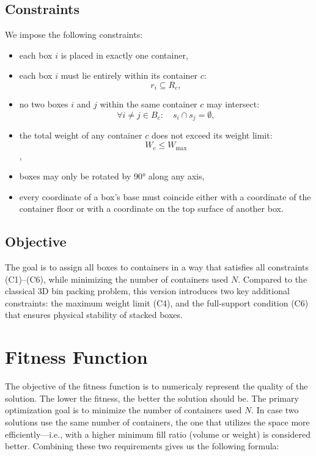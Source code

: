 \subsection*{Constraints}

We impose the following constraints:

\begin{itemize}
    \item[\textbf{(C1)}] each box $i$ is placed in exactly one container,
    
    \item[\textbf{(C2)}] each box $i$ must lie entirely within its container $c$:
         \[r_i \subseteq R_c,\]
    
    \item[\textbf{(C3)}] no two boxes $i$ and $j$ within the same container $c$ may intersect:
    \[
    \forall i \neq j \in B_c: \quad s_i \cap s_j = \emptyset,
    \]
    
    \item[\textbf{(C4)}] the total weight of any container $c$ does not exceed its weight limit:
    \[
    W_c \leq W_\text{max}
    \],
    
    \item[\textbf{(C5)}] boxes may only be rotated by 90° along any axis,
    
    \item[\textbf{(C6)}] every coordinate of a box’s base must coincide either with a coordinate of the container floor or with a coordinate on the top surface of another box.
\end{itemize}

\subsection*{Objective}

The goal is to assign all boxes to containers in a way that satisfies all constraints (C1)--(C6), while minimizing the number of containers used $N$.
Compared to the classical 3D bin packing problem, this version introduces two key additional constraints: the maximum weight limit (C4), and the full-support condition (C6) that ensures physical stability of stacked boxes.




\section{Fitness Function}

The objective of the fitness function is to numericaly represent the quality of the solution. 
The lower the fitness, the better the solution should be. 
The primary optimization goal is to minimize the number of containers used $N$. 
In case two solutions use the same number of containers, the one that utilizes the space more efficiently—i.e., with a higher minimum fill ratio (volume or weight) is considered better.
Combining these two requirements gives us the following formula:

